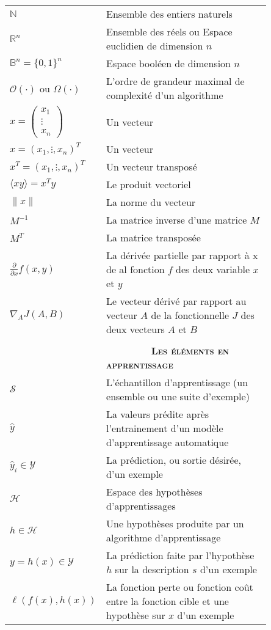 \begin{tabular}{l p{0.85\linewidth}}
	$\mathbb{N} $ & Ensemble des entiers naturels\\
	$\mathbb{R}^n $ & Ensemble des réels ou  Espace euclidien de dimension $n$ \\
	$\mathbb{B}^n = \{0,1\}^n $ & Espace booléen de dimension $n$\\
	$\mathcal{O}(\cdot) $ ou $ {\Omega}(\cdot) $ & L'ordre de grandeur maximal de complexité d'un algorithme \\
	
	
	$x = \begin{pmatrix}
	x_1 \\ \vdots \\ x_n 
	\end{pmatrix} $ & Un vecteur\\ 
	$x =  (x_1, \vdots,  x_n)^T$ & Un vecteur \\ 
	$x^T =  (x_1, \vdots,  x_n)^T$ & Un vecteur transposé \\ 
	$ \langle xy\rangle = x^Ty$  & Le produit vectoriel \\ 
	$\parallel x \parallel $ & La norme du vecteur\\
	
	
	$M^{-1}$ & La matrice inverse d'une matrice $M$\\
	$M^{T}$ & La matrice transposée \\
	
	$\frac{\partial}{\partial x}f(x,y) $ & La dérivée partielle par rapport à x de al fonction $f$ des deux variable $x$ et $y$ \\ 
	
	$\nabla_A J(A,B) $ & Le vecteur dérivé par rapport au vecteur $A$ de la fonctionnelle $J$ des deux vecteurs $A$ et $B$ \\ 
	
	$ $ & \\
	
	$ $ & \textbf{  \ \ \ \ \ \ \ \ \textsc{Les éléments en apprentissage}} \\
	
	$ \mathcal{S} $ & L'échantillon d'apprentissage (un ensemble ou une suite d'exemple)  \\ 
	$ \hat{y}$ & La valeurs prédite après l'entrainement d'un modèle d'apprentissage automatique \\ 
	$ \hat{y}_i \in  \mathcal{Y} $ & La prédiction, ou sortie désirée, d'un exemple \\
	$ \mathcal{H} $ &  Espace des hypothèses d'apprentissages \\
	$ h \in \mathcal{H} $ & Une hypothèses produite par un algorithme d'apprentissage \\
	$ y = h(x) \in \mathcal{Y} $ & La prédiction faite par l'hypothèse $h$ sur la description $s$ d'un exemple \\
	$ \ell(f(x),h(x)) $ & La fonction perte ou fonction coût entre la fonction  cible et une hypothèse sur $x$ d'un exemple \\
	

\end{tabular}
